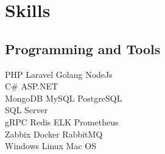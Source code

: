\documentclass[]{deedy-resume-openfont}
\begin{document}
\begin{minipage}[t]{0.33\textwidth}
\section{Skills}
\subsection{Programming and Tools}

PHP \textbullet{} Laravel \textbullet{} Golang \textbullet{} NodeJs \textbullet{} \\ 
C\# \textbullet{} ASP.NET \\

MongoDB \textbullet{} MySQL \textbullet{} PostgreSQL \textbullet{} \\
SQL Server \textbullet{} \\

gRPC \textbullet{} Redis \textbullet{} ELK \textbullet{} Prometheus \textbullet{} \\ Zabbix \textbullet{} Docker \textbullet{} RabbitMQ \textbullet{}  \\

Windows \textbullet{} Linux \textbullet{} Mac OS \textbullet{} \\
\sectionsep


\end{minipage} 
\hfill
\end{document}
